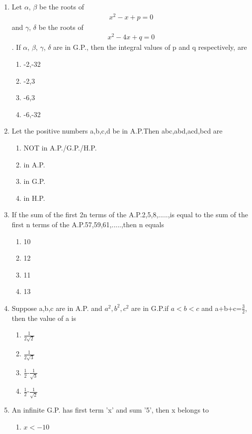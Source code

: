 \begin{enumerate}[label=\arabic*.,ref=\thesubsection.\theenumi]
\begin{enumerate}
\end{enumerate}
\item Let $\alpha$, $\beta$ be the roots of 
\begin{align}
x^2-x+p=0
\end{align} and $\gamma$, $\delta$ be the roots of 
\begin{align}
x^2-4x+q=0
\end{align}. If $\alpha$, $\beta$, $\gamma$, $\delta$ are in G.P., then the integral values of p and q respectively, are
\begin{enumerate}
\item -2,-32 
\item -2,3 
\item -6,3 
\item -6,-32
\end{enumerate}
\item Let the positive numbers a,b,c,d be in A.P.Then abc,abd,acd,bcd are
\begin{enumerate}
\item NOT in A.P./G.P./H.P. 
\item in A.P.
\item in G.P.
\item in H.P.
\end{enumerate}
\item If the sum of the first 2n terms of the A.P.2,5,8,.....,is equal to the sum of the first n terms of the A.P.57,59,61,.....,then n equals
\begin{enumerate}
\item 10 
\item 12 
\item 11 
\item 13
\end{enumerate}
\item Suppose a,b,c are in A.P. and $a^2, b^2, c^2$ are in G.P.if $a<b<c$ and a+b+c=$\frac{3}{2}$, then the value of a is
\begin{enumerate}
\item $\frac{1}{2\sqrt{2}}$ 
\item $\frac{1}{2\sqrt{3}}$ 
\item $\frac{1}{2}$-$\frac{1}{\sqrt{3}}$ 
\item $\frac{1}{2}$-$\frac{1}{\sqrt{2}}$
\end{enumerate}
\item An infinite G.P. has first term 'x' and sum '5', then x belongs to
\begin{enumerate}
\item $x<-10$ 

\end{enumerate}
\end{enumerate}
